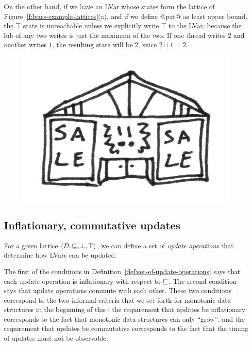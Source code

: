 On the other hand, if we have an LVar whose states form the lattice of
Figure~\ref{f:lvars-example-lattices}(a), and if we define @put@ as
least upper bound, the $\top$ state is unreachable unless we
explicitly write $\top$ to the LVar, because the lub of any two writes
is just the maximum of the two.  If one thread writes $2$ and another
writes $1$, the resulting state will be $2$, since $2 \sqcup 1 = 2$.

\ifdefined\DISSERTATION
\begin{figure}
  \vspace{-2em}
  \begin{center}
    \includegraphics[scale=0.15]{../illustrations/store}
  \end{center}
  \vspace{-2em}
\end{figure}
\fi

\subsection{Inflationary, commutative updates}

For a given lattice $(D, \sqsubseteq, \bot, \top)$, we can define a set
of \emph{update operations} that determine how LVars can be updated:

\DefSetOfUpdateOperations
%
The first of the conditions in
Definition~\ref{def:set-of-update-operations} says that each update
operation is inflationary with respect to $\sqsubseteq$.  The second
condition says that update operations commute with each other.  These
two conditions correspond to the two informal criteria that we set
forth for monotonic data structures at the beginning of this
: the requirement that updates be
inflationary corresponds to the fact that monotonic data structures
can only ``grow'', and the requirement that updates be commutative
corresponds to the fact that the timing of updates must not be
observable.

